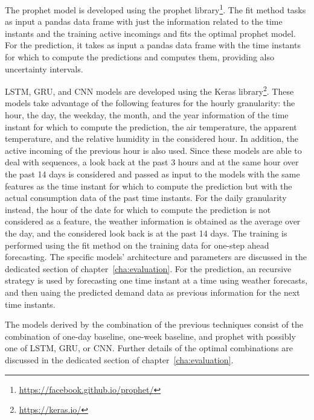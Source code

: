The prophet model is developed using the prophet library\footnote{ \url{https://facebook.github.io/prophet/} }.
The fit method tasks as input a pandas data frame with just the information related to the time instants and the training active incomings and fits the optimal prophet model.
For the prediction, it takes as input a pandas data frame with the time instants for which to compute the predictions and computes them, providing also uncertainty intervals.

LSTM, GRU, and CNN models are developed using the Keras library\footnote{ \url{https://keras.io/} }.
These models take advantage of the following features for the hourly granularity: the hour, the day, the weekday, the month, and the year information of the time instant for which to compute the prediction, the air temperature, the apparent temperature, and the relative humidity in the considered hour.
In addition, the active incoming of the previous hour is also used.
Since these models are able to deal with sequences, a look back at the past 3 hours and at the same hour over the past 14 days is considered and passed as input to the models with the same features as the time instant for which to compute the prediction but with the actual consumption data of the past time instants.
For the daily granularity instead, the hour of the date for which to compute the prediction is not considered as a feature, the weather information is obtained as the average over the day, and the considered look back is at the past 14 days.
The training is performed using the fit method on the training data for one-step ahead forecasting.
The specific models’ architecture and parameters are discussed in the dedicated section of chapter~\ref{cha:evaluation}.
For the prediction, an recursive strategy is used by forecasting one time instant at a time using weather forecasts, and then uaing the predicted demand data as previous information for the next time instants.

The models derived by the combination of the previous techniques consist of the combination of one-day baseline, one-week baseline, and prophet with possibly one of LSTM, GRU, or CNN.
Further details of the optimal combinations are discussed in the dedicated section of chapter~\ref{cha:evaluation}.

